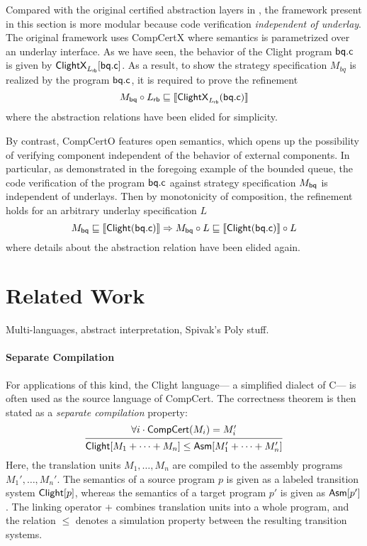 \documentclass[acmsmall,review,anonymous]{acmart}\settopmatter{printfolios=true,printccs=false,printacmref=false}
\begin{document}
Compared with the original certified abstraction layers
in \cite{popl15},
the framework present in this section
is more modular
because code verification \emph{independent of underlay}.
The original framework uses CompCertX
where semantics is parametrized
over an underlay interface.
As we have seen,
the behavior of the Clight program $ \mathsf{bq.c} $
is given by $ \mathsf{ClightX} _{L_{ \mathsf{rb} }}[ \mathsf{bq.c} ]$.
As a result, to show the strategy specification $M_{bq}$
is realized by the program $ \mathsf{bq.c} $,
it is required to prove the refinement
\[
  M_{ \mathsf{bq} } \circ L_{ \mathsf{rb} } \sqsubseteq
  \llbracket  \mathsf{ClightX} _{L_{ \mathsf{rb} }}( \mathsf{bq.c} ) \rrbracket
\]
where the abstraction relations
have been elided for simplicity.

By contrast,
CompCertO features open semantics,
which opens up the possibility of
verifying component independent of
the behavior of external components.
In particular,
as demonstrated in the foregoing example of the bounded queue,
the code verification
of the program $ \mathsf{bq.c} $
against strategy specification $M_{ \mathsf{bq} }$
is independent of underlays.
Then by monotonicity of composition,
the refinement holds for an arbitrary underlay specification $L$
\[
  M_{ \mathsf{bq} } \sqsubseteq \llbracket  \mathsf{Clight} ( \mathsf{bq.c} ) \rrbracket
  \Rightarrow
  M_{ \mathsf{bq} } \circ L \sqsubseteq \llbracket  \mathsf{Clight} ( \mathsf{bq.c} ) \rrbracket \circ L
\]
where details about the abstraction relation have been elided again.


\section{Related Work} %

Multi-languages,
abstract interpretation,
Spivak's Poly stuff.

\paragraph{Separate Compilation} %

For applications of this kind,
the Clight language---%
a simplified dialect of C---%
is often used as the source language of CompCert.
The correctness theorem is then stated as
a \emph{separate compilation} \cite{sepcompcert} property:
\begin{equation} \label{eqn:scc}
  \begin{prooftree}
    \hypo{\forall i \cdot \kw{CompCert}(M_i) = M_i'}
    \infer1{\kw{Clight}[M_1 + \cdots + M_n]
      \le \kw{Asm}[M_1' + \cdots + M_n']}
  \end{prooftree}
\end{equation}
Here,
the translation units $M_1, \ldots, M_n$
are compiled to the assembly programs $M_1', \ldots, M_n'$.
The semantics of a source program $p$
is given as a labeled transition system $ \mathsf{Clight} [p]$,
whereas the semantics of a target program $p'$
is given as $ \mathsf{Asm} [p']$.
The linking operator $+$
combines translation units into a whole program,
and the relation $\le$ denotes a simulation property
between the resulting transition systems.
\end{document}
